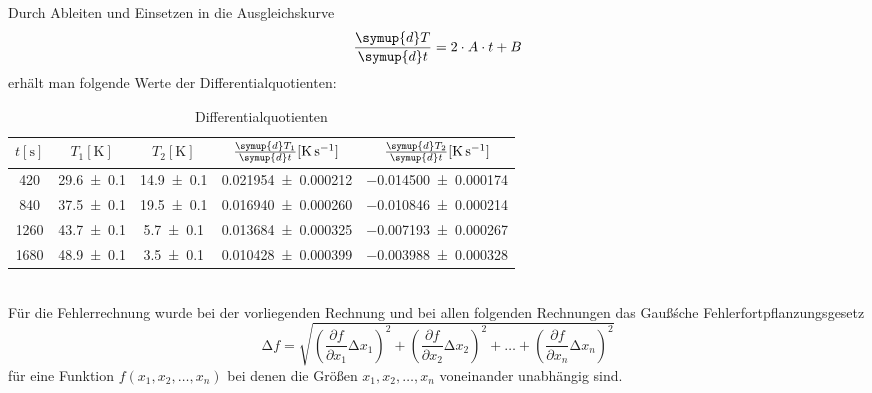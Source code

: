 Durch Ableiten und Einsetzen in die Ausgleichskurve
\begin{equation}
  \frac{\symup{d}T}{\symup{d}t}= 2 \cdot A \cdot t + B
\end{equation}
erhält man folgende Werte der Differentialquotienten:
\begin{table}
  \centering
  \caption{Differentialquotienten}
  \label{tab:tabelle1}
  \begin{tabular}{c c c c c}
    \toprule
    {$t [\si{\second}]$} & {$T_1 [\si{\kelvin}]$} & {$T_2 [\si{\kelvin}]$} & {$\frac{\symup{d}T_1}{\symup{d}t} [\si{\kelvin\per\second}]$}  & {$\frac{\symup{d}T_2}{\symup{d}t} [\si{\kelvin\per\second}]$}\\
    \midrule
    \num{420} & \num{29.6 +- 0.1} & \num{14.9 +- 0.1} & \num{0.021954 +- 0.000212} & \num{-0.014500 +- 0.000174} \\
    \num{840} & \num{37.5 +- 0.1} & \num{19.5 +- 0.1} & \num{0.016940 +- 0.000260} & \num{-0.010846 +- 0.000214} \\
    \num{1260} & \num{43.7 +- 0.1} & \num{5.7 +- 0.1} & \num{0.013684 +- 0.000325} & \num{-0.007193 +- 0.000267} \\
    \num{1680} & \num{48.9 +- 0.1} & \num{3.5 +- 0.1} & \num{0.010428 +- 0.000399} & \num{-0.003988 +- 0.000328} \\
    \bottomrule
  \end{tabular}
\end{table}
\\
Für die Fehlerrechnung wurde bei der vorliegenden Rechnung und bei allen folgenden Rechnungen das Gauß\'sche Fehlerfortpflanzungsgesetz
\begin{equation}
\increment{f} = \sqrt{(\frac{\partial f}{\partial x_1}\increment{x_1})^2 + (\frac{\partial f}{\partial x_2}\increment{x_2})^2 + \dotsc + (\frac{\partial f}{\partial x_n}\increment{x_n})^2}
\end{equation}
für eine Funktion $f(x_1,x_2, \dotsc ,x_n)$ bei denen die Größen $x_1, x_2, \dotsc , x_n$ voneinander unabhängig sind.

